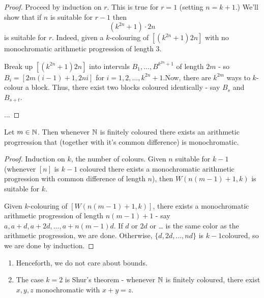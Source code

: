 \begin{proof}
  Proceed by induction on $r$.  This is true for $r = 1$ (setting $n =
  k + 1$.)  We'll show that if $n$ is suitable for $r - 1$ then
  \begin{equation}
    \label{eq:2}
    (k^{2n} + 1) \cdot 2n
  \end{equation} is suitable for $r$.  Indeed, given a $k$-colouring
  of $[(k^{2n} + 1) 2n]$ with no monochromatic arithmetic progression
  of length 3.

  Break up $[(k^{2n} + 1)2n]$ into intervals $B_{1}, \dots, B^{k^{2n}
    + 1}$ of length $2m$ - so $B_{i} = [2m(i-1)  +1, 2ni]$ for $i = 1,
  2, \dots, k^{2n} +1$.Now, there are $k^{2m}$ ways to $k$-colour a
  block. Thus, there exist two blocks coloured identically - say
  $B_{s}$ and $B_{s+t}$.  

  ...
\end{proof}


\begin{thm}
  \label{defn:van_der_waerdens_theorem:3}
  Let $m \in \mathbb{N}$.  Then whenever $\mathbb{N}$ is finitely coloured there
  exists an arithmetic progrression that (together with it's common
  difference) is monochromatic.
\end{thm}

\begin{proof}
  Induction on $k$, the number of colours.  Given $n$ suitable for $k
  - 1$ (whenever $[n]$ is $k-1$ coloured there exists a monochromatic
  arithmetic progression with common difference of length $n$), then
  $W(n(m-1) + 1, k)$ is suitable for $k$.

  Given $k$-colouring of $[W(n(m-1) + 1, k)]$, there exists a
  monochromatic arithmetic progression of length $n(m-1) + 1$ - say
  $a, a + d, a + 2d, \dots, a + n(m-1)d$. If $d$ or $2d$ or \dots{} is
  the same color as the arithmetic progression, we are done.
  Otherwise, $\{ d, 2d, \dots, nd \}$ is $k-1$coloured, so we are done
  by induction.
\end{proof}

\begin{remark}
  \begin{enumerate}
  \item Henceforth, we do not care about bounds.
  \item The case $k = 2$ is Shur's theorem - whenever $\mathbb{N}$ is finitely
    coloured, there exist $x, y, z$ monochromatic with $x + y = z$.
  \end{enumerate}
\end{remark}

